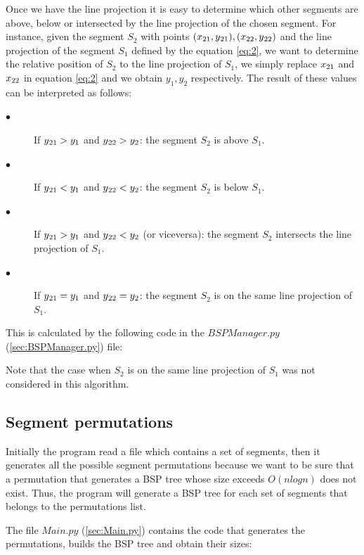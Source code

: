 \documentclass{article}
\begin{document}
Once we have the line projection it is easy to determine which other segments are above, below or intersected by the line projection of the chosen segment. For instance, given the segment $S_2$ with points $(x\textsubscript{21},y\textsubscript{21}),(x\textsubscript{22},y\textsubscript{22})$ and the line projection of the segment $S_1$ defined by the equation \ref{eq:2}, we want to determine the relative position of $S_2$  to the line projection of $S_1$, we simply replace $x\textsubscript{21}$ and $x\textsubscript{22}$ in equation \ref{eq:2} and we
obtain $y_1, y_2$ respectively. The result of these values can be interpreted as follows:
\begin{description}
\item[$\bullet$] If $y\textsubscript{21} > y_1$ and $y\textsubscript{22} > y_2$: the segment $S_2$ is above $S_1$.
\item[$\bullet$] If $y\textsubscript{21} < y_1$ and $y\textsubscript{22} < y_2$: the segment $S_2$ is below $S_1$.
\item[$\bullet$] If $y\textsubscript{21} > y_1$ and $y\textsubscript{22} < y_2$ (or viceversa): the segment $S_2$ intersects the line projection of $S_1$.
\item[$\bullet$] If $y\textsubscript{21} = y_1$ and $y\textsubscript{22} = y_2$: the segment $S_2$ is on the same line projection of $S_1$.
\end{description}

This is calculated by the following code in the $BSPManager.py$ (\ref{sec:BSPManager.py}) file:



Note that the case when $S_2$ is on the same line projection of $S_1$ was not considered in this algorithm.

\subsection{Segment permutations}

Initially the program read a file which contains a set of segments, then it generates all the possible segment permutations because we want to be sure that a permutation that generates a BSP tree whose size exceeds $O(nlogn)$ does not exist. Thus, the program will generate a BSP tree for each set of segments that belongs to the permutations list. 

The file $Main.py$ (\ref{sec:Main.py}) contains the code that generates the permutations, builds the BSP tree and obtain their sizes:
\end{document}

